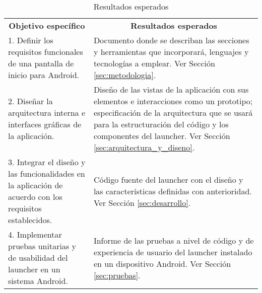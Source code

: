 \begin{table}[H]
\caption{Resultados esperados}
\begin{tabular*}{\textwidth}{|p{}|p{}|}
\cline{1-2}
\multicolumn{1}{|c|}{\cellcolor[gray]{0.9} \textbf{Objetivo específico}} &  \multicolumn{1}{|c|}{\cellcolor[gray]{0.9} \textbf{Resultados esperados}}  \\
\cline{1-2}
1. Definir los requisitos funcionales de una pantalla de inicio para Android. & 
Documento donde se describan las secciones y herramientas que incorporará, lenguajes y tecnologías a emplear. Ver Sección \ref{sec:metodologia}.
\\
\cline{1-2} 

2. Diseñar la arquitectura interna e interfaces gráficas de la aplicación. & 
Diseño de las vistas de la aplicación con sus elementos e interacciones como un prototipo; especificación de la arquitectura que se usará para la estructuración del código y los componentes del launcher. Ver Sección \ref{sec:arquitectura_y_diseno}.
\\

\cline{1-2} 

3. Integrar el diseño y las funcionalidades en la aplicación de acuerdo con los requisitos establecidos. & 
Código fuente del launcher con el diseño y las características definidas con anterioridad. Ver Sección \ref{sec:desarrollo}. \\

\cline{1-2} 

4. Implementar pruebas unitarias y de usabilidad del launcher en un sistema Android. & 
Informe de las pruebas a nivel de código y de experiencia de usuario del launcher instalado en un dispositivo Android. Ver Sección \ref{sec:pruebas}. \\

\cline{1-2} 

\end{tabular*}
\end{table}






